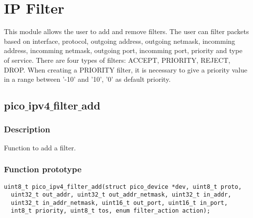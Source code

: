 \section{IP Filter}

This module allows the user to add and remove filters. The user can filter packets based on interface, protocol, outgoing address, outgoing netmask, incomming address, incomming netmask, outgoing port, incomming port, priority and type of service. There are four types of filters: ACCEPT, PRIORITY, REJECT, DROP. When creating a PRIORITY filter, it is necessary to give a priority value in a range between '-10' and '10', '0' as default priority.


\subsection{pico$\_$ipv4$\_$filter$\_$add}

\subsubsection*{Description}
Function to add a filter.

\subsubsection*{Function prototype}
\begin{verbatim}
uint8_t pico_ipv4_filter_add(struct pico_device *dev, uint8_t proto,
  uint32_t out_addr, uint32_t out_addr_netmask, uint32_t in_addr,
  uint32_t in_addr_netmask, uint16_t out_port, uint16_t in_port,
  int8_t priority, uint8_t tos, enum filter_action action);
\end{verbatim}

